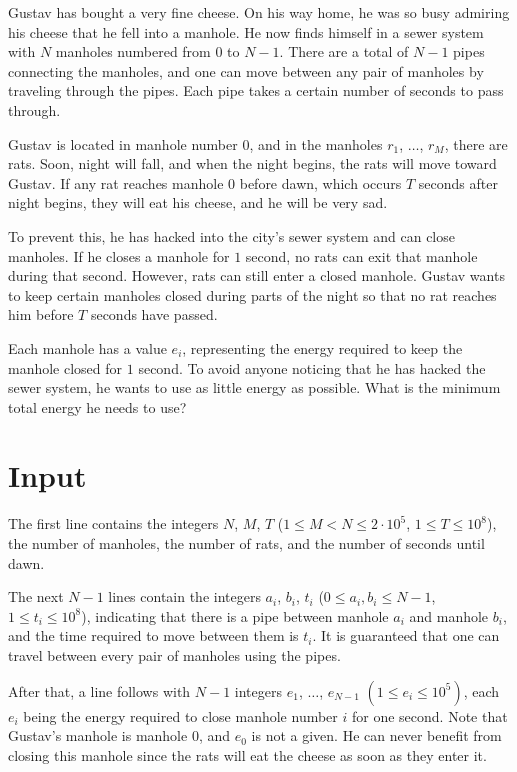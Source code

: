 \noindent
Gustav has bought a very fine cheese. On his way home, he was so busy admiring his cheese that he fell into a manhole.
He now finds himself in a sewer system with $N$ manholes numbered from $0$ to $N-1$. There are a total of $N-1$ pipes
connecting the manholes, and one can move between any pair of manholes by traveling through the pipes.
Each pipe takes a certain number of seconds to pass through.

Gustav is located in manhole number $0$, and in the manholes $r_1$, $\dots$, $r_M$, there are rats.
Soon, night will fall, and when the night begins, the rats will move toward Gustav. If any rat reaches manhole $0$
before dawn, which occurs $T$ seconds after night begins, they will eat his cheese, and he will be very sad.

To prevent this, he has hacked into the city's sewer system and can close manholes. If he closes a manhole for
$1$ second, no rats can exit that manhole during that second. However, rats can still enter a closed manhole.
Gustav wants to keep certain manholes closed during parts of the night so that no rat reaches him before $T$ seconds
have passed.

Each manhole has a value $e_i$, representing the energy required to keep the manhole closed for $1$ second.
To avoid anyone noticing that he has hacked the sewer system, he wants to use as little energy as possible.
What is the minimum total energy he needs to use?

\section*{Input}
The first line contains the integers $N$, $M$, $T$ ($1 \leq  M < N \leq 2 \cdot 10^5$, $1 \leq T \leq 10^8$),
the number of manholes, the number of rats, and the number of seconds until dawn.

The next $N-1$ lines contain the integers $a_i$, $b_i$, $t_i$ ($0 \leq a_i,b_i \leq N-1$, $1 \leq t_i \leq 10^8$),
indicating that there is a pipe between manhole $a_i$ and manhole $b_i$, and the time required to move between them
is $t_i$. It is guaranteed that one can travel between every pair of manholes using the pipes.

After that, a line follows with $N-1$ integers $e_1$, $\dots$, $e_{N-1}$ $(1 \leq e_i \leq 10^5)$, each $e_i$ being
the energy required to close manhole number $i$ for one second. Note that Gustav's manhole is manhole $0$, and $e_0$
is not a given. He can never benefit from closing this manhole since the rats will eat the cheese as soon as they
enter it.

